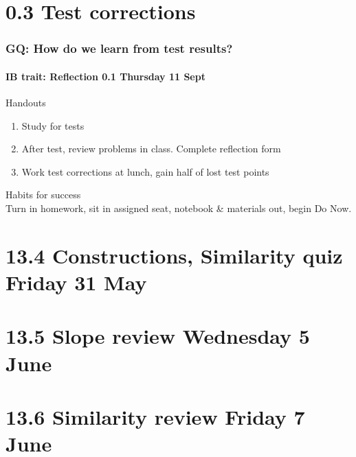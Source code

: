 \documentclass{beamer}
\begin{document}
\section{0.3 Test corrections}
  \frame
  {
    \frametitle{GQ: How do we learn from test results?}
    \framesubtitle{IB trait: Reflection \hfill \alert{0.1 Thursday 11 Sept}}

    \begin{block}{Handouts}
      \begin{enumerate}
        \item Study for tests
        \item After test, review problems in class. Complete reflection form
        \item Work test corrections at lunch, gain half of lost test points
      \end{enumerate}
    \end{block}
    Habits for success\\[0.25cm]
    Turn in homework, sit in assigned seat, notebook \& materials out, begin Do Now.
  }

\section{13.4 Constructions, Similarity quiz Friday 31 May}
  \frame
  {

  }

  \section{13.5 Slope review Wednesday 5 June}
    \frame
    {

    }

    \frame
    {

      }

  \section{13.6 Similarity review Friday 7 June}
    \frame
    {

    }
\end{document}
